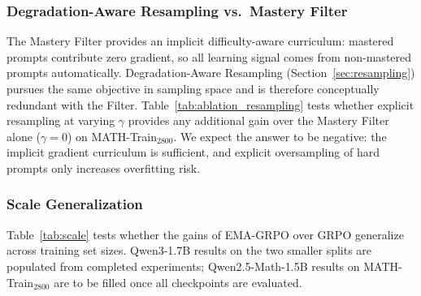 \documentclass[11pt]{article}
\newcommand{\method}{EMA-GRPO}
\theoremstyle{definition}
\begin{document}
\subsubsection{Degradation-Aware Resampling vs.\ Mastery Filter}
\label{sec:resampling_ablation}

The Mastery Filter provides an implicit difficulty-aware curriculum:
mastered prompts contribute zero gradient, so all learning signal comes
from non-mastered prompts automatically.
Degradation-Aware Resampling (Section~\ref{sec:resampling}) pursues the same
objective in sampling space and is therefore conceptually redundant with
the Filter.
Table~\ref{tab:ablation_resampling} tests whether explicit resampling at
varying $\gamma$ provides any additional gain over the Mastery Filter alone
($\gamma=0$) on MATH-Train$_{\text{2800}}$.
We expect the answer to be negative: the implicit gradient curriculum
is sufficient, and explicit oversampling of hard prompts only increases
overfitting risk.

\begin{table}[t]
\centering
\caption{Degradation-Aware Resampling: effect of $\gamma$ across all benchmarks
  (Qwen2.5-Math-1.5B, MATH-Train$_{\text{2800}}$, best checkpoint).
  $\gamma=0$ is \method{} without resampling.}
\label{tab:ablation_resampling}
\end{table}

\subsubsection{Scale Generalization}
\label{sec:scale}

Table~\ref{tab:scale} tests whether the gains of \method{} over GRPO
generalize across training set sizes.
Qwen3-1.7B results on the two smaller splits are populated from completed
experiments; Qwen2.5-Math-1.5B results on MATH-Train$_{\text{2800}}$
are to be filled once all checkpoints are evaluated.
\end{document}
